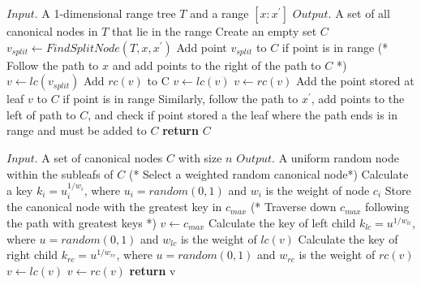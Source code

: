 \documentclass{article}
\begin{document}
\begin{algorithm}
\caption{$FindCanonicalSet(T,[x:x^\prime]$}
\begin{algorithmic}[1]
    \Statex $Input.$ A 1-dimensional range tree $T$ and a range $[x:x^\prime]$
    \Statex $Output.$ A set of all canonical nodes in $T$ that lie in the range
    \State Create an empty set $C$
    \State $v_{split} \gets FindSplitNode(T, x, x^\prime)$
        \State Add point $v_{split}$ to $C$ if point is in range 
    \Else
        \State (* Follow the path to $x$ and add points to the right of the path to $C$ *)
        \State $v \gets lc(v_{split})$
                \State Add $rc(v)$ to C
                \State $v \gets lc(v)$
            \Else 
                \State $v \gets rc(v)$
            \EndIf
        \EndWhile
        \State Add the point stored at leaf $v$ to $C$ if point is in range
        \State Similarly, follow the path to $x^\prime$, add points to the left of path to $C$, and \Statex \hspace{11.5 pt} check if point stored a the leaf where the path ends is in range and must \Statex \hspace{11.5 pt} be added to $C$
    \EndIf
    \State \textbf{return} $C$
\end{algorithmic}
\end{algorithm}

\begin{algorithm}
\caption{$UniformRandomNode(C)$}
\begin{algorithmic}[1]
    \Statex $Input.$ A set of canonical nodes $C$ with size $n$
    \Statex $Output.$ A uniform random node within the subleafs of $C$  
    \State (* Select a weighted random canonical node*)
        \State Calculate a key $k_i = u_i^{1/w_i}$, where $u_i = random(0,1)$ and $w_i$ is the \Statex \hspace{11.5 pt} weight of node $c_i$
    \EndFor
    \State Store the canonical node with the greatest key in $c_{max}$
    \State (* Traverse down $c_{max}$ following the path with greatest keys *)
    \State $v \gets c_{max}$
        \State Calculate the key of left child $k_{lc} = u^{1/w_{lc}}$, where $u = random(0,1)$ and \Statex \hspace{11.5 pt} $w_{lc}$ is the weight of $lc(v)$
        \State Calculate the key of right child $k_{rc} = u^{1/w_{rc}}$, where $u = random(0,1)$ \Statex \hspace{11.5 pt} and $w_{rc}$ is the weight of $rc(v)$
            \State $v \gets lc(v)$
        \Else
            \State $v \gets rc(v)$
        \EndIf
    \EndWhile
    \State \textbf{return} v 
\end{algorithmic}
\end{algorithm}
\end{document}
